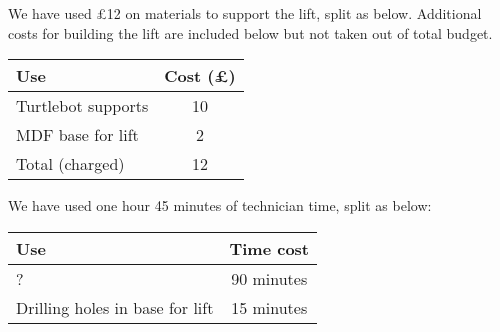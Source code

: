 \documentclass{article}
\begin{document}
We have used \pounds 12 on materials to support the lift, split as below. Additional costs for building the lift are included below but not taken out of total budget. 

\begin{tabular}{l|c}
  \hline
  {\bf Use} & {\bf Cost (\pounds)} \\
  \hline 
  Turtlebot supports & 10 \\
  MDF base for lift & 2 \\
  \hline
  Total (charged) & 12 \\
  \hline
  
\end{tabular}

We have used one hour 45 minutes of technician time, split as below:

\begin{tabular}{l|c}
  \hline
  {\bf Use} & {\bf Time cost} \\
  \hline 
  ? & 90 minutes \\ 
  Drilling holes in base for lift & 15 minutes \\
\end{tabular}
\end{document}
